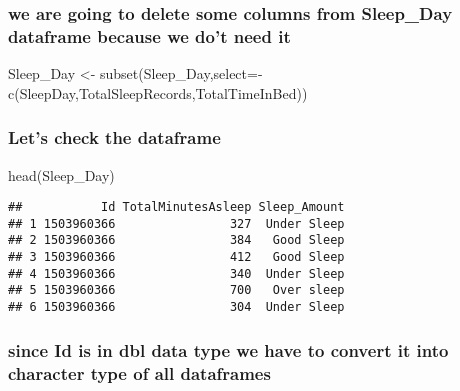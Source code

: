 \documentclass[
]{article}
\newenvironment{Shaded}{\begin{snugshade}}{\end{snugshade}}
\newcommand{\AttributeTok}[1]{\textcolor[rgb]{0.77,0.63,0.00}{#1}}
\newcommand{\FunctionTok}[1]{\textcolor[rgb]{0.00,0.00,0.00}{#1}}
\newcommand{\NormalTok}[1]{#1}
\newcommand{\OtherTok}[1]{\textcolor[rgb]{0.56,0.35,0.01}{#1}}
\newcommand{\SpecialCharTok}[1]{\textcolor[rgb]{0.00,0.00,0.00}{#1}}
\begin{document}
\hypertarget{we-are-going-to-delete-some-columns-from-sleep_day-dataframe-because-we-dot-need-it}{%
\subsubsection{we are going to delete some columns from Sleep\_Day
dataframe because we do't need
it}\label{we-are-going-to-delete-some-columns-from-sleep_day-dataframe-because-we-dot-need-it}}

\begin{Shaded}
\begin{Highlighting}[]
\NormalTok{Sleep\_Day }\OtherTok{\textless{}{-}} \FunctionTok{subset}\NormalTok{(Sleep\_Day,}\AttributeTok{select=}\SpecialCharTok{{-}}\FunctionTok{c}\NormalTok{(SleepDay,TotalSleepRecords,TotalTimeInBed))}
\end{Highlighting}
\end{Shaded}

\hypertarget{lets-check-the-dataframe}{%
\subsubsection{Let's check the
dataframe}\label{lets-check-the-dataframe}}

\begin{Shaded}
\begin{Highlighting}[]
\FunctionTok{head}\NormalTok{(Sleep\_Day)}
\end{Highlighting}
\end{Shaded}

\begin{verbatim}
##           Id TotalMinutesAsleep Sleep_Amount
## 1 1503960366                327  Under Sleep
## 2 1503960366                384   Good Sleep
## 3 1503960366                412   Good Sleep
## 4 1503960366                340  Under Sleep
## 5 1503960366                700   Over sleep
## 6 1503960366                304  Under Sleep
\end{verbatim}

\hypertarget{since-id-is-in-dbl-data-type-we-have-to-convert-it-into-character-type-of-all-dataframes}{%
\subsubsection{since Id is in dbl data type we have to convert it into
character type of all
dataframes}\label{since-id-is-in-dbl-data-type-we-have-to-convert-it-into-character-type-of-all-dataframes}}
\end{document}
